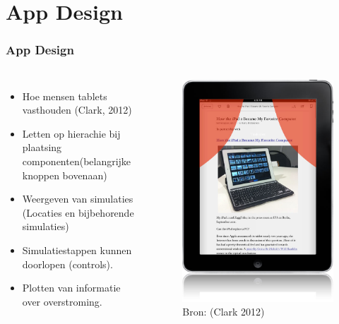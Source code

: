 \documentclass[10pt,a4paper]{beamer}
\begin{document}
\section{App Design}
\begin{frame}
\frametitle{App Design}
\begin{columns}[c]
\column{5cm}
\begin{itemize}
\item Hoe mensen tablets vasthouden (Clark, 2012)
\item Letten op hierachie bij plaatsing componenten(belangrijke knoppen bovenaan)
\item Weergeven van simulaties (Locaties en bijbehorende simulaties)
\item Simulatiestappen kunnen doorlopen (controls).
\item Plotten van informatie over overstroming.
\end{itemize}
\column{5cm}
\begin{figure}
\includegraphics[scale=0.2]{touch.png}
\caption{Bron: \url{} (Clark 2012)}
\end{figure}
\end{columns}
\end{frame}
\end{document}
